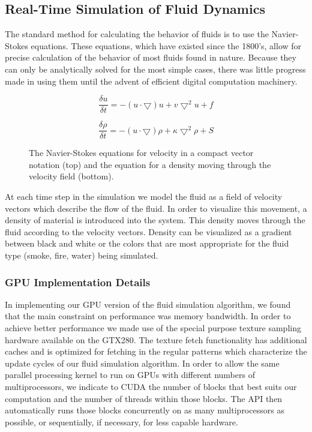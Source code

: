 \documentclass[conference]{IEEEtran}
\begin{document}
\subsection{Real-Time Simulation of Fluid Dynamics}

The standard method for calculating the behavior of fluids is to use the Navier-Stokes equations. These equations, which have existed since the 1800's, allow for precise calculation of the behavior of most fluids found in nature. Because they can only be analytically solved for the most simple cases, there was little progress made in using them until the advent of efficient digital computation machinery. 

\begin{figure}[b]
\begin{equation}
\frac{\delta u}{\delta t} = -(u \cdot \bigtriangledown)u + v \bigtriangledown^2u + f
\end{equation}

\begin{equation}
\frac{\delta \rho}{\delta t} = -(u \cdot \bigtriangledown)\rho + \kappa \bigtriangledown^2\rho + S
\end{equation}
\caption{The Navier-Stokes equations for velocity in a compact vector notation (top) and the equation for a density moving through the velocity field (bottom).\cite{Stam:2003}}
\end{figure}

At each time step in the simulation we model the fluid as a field of velocity vectors which describe the flow of the fluid. In order to visualize this movement, a density of material is introduced into the system. This density moves through the fluid according to the velocity vectors. Density can be visualized as a gradient between black and white or the colors that are most appropriate for the fluid type (smoke, fire, water) being simulated. 

\subsubsection{GPU Implementation Details}

In implementing our GPU version of the fluid simulation algorithm, we found that the main constraint on performance was memory bandwidth. In order to achieve better performance we made use of the special purpose texture sampling hardware available on the GTX280. The texture fetch functionality has additional caches and is optimized for fetching in the regular patterns which characterize the update cycles of our fluid simulation algorithm.\cite{Sanders:2001} In order to allow the same parallel processing kernel to run on GPUs with different numbers of multiprocessors, we indicate to CUDA the number of blocks that best suits our computation and the number of threads within those blocks. The API then automatically runs those blocks concurrently on as many multiprocessors as possible, or sequentially, if necessary, for less capable hardware.
\end{document}
